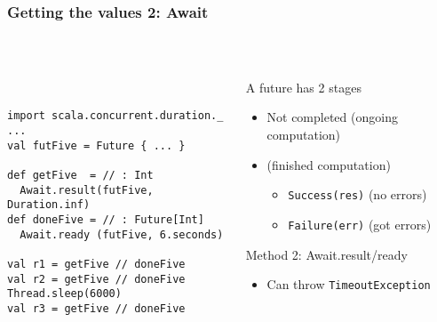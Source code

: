 \documentclass[aspectratio=169]{beamer}
\begin{document}
\begin{frame}[fragile]\frametitle{Getting the values 2: Await}
~\\[-8mm]
\begin{columns}
\begin{column}{0.56\textwidth}
~\\
\begin{lstlisting}[emph={execute,sleep,log,Future,Try,Success,Failure,onComplete,Await,result,ready}]
import scala.concurrent.duration._
...
val futFive = Future { ... }

def getFive  = // : Int
  Await.result(futFive, Duration.inf) 
def doneFive = // : Future[Int]
  Await.ready (futFive, 6.seconds)

val r1 = getFive // doneFive
val r2 = getFive // doneFive
Thread.sleep(6000)
val r3 = getFive // doneFive
\end{lstlisting}
\end{column}
\begin{column}{0.46\textwidth}
\begin{block}{A future has 2 stages}
\begin{itemize}
  \item \alert{Not completed} (ongoing computation)
  \item {} (finished computation)
  \begin{itemize}
    \item \texttt{Success(res)} (no errors)
    \item \texttt{Failure(err)} (got errors)
  \end{itemize}
\end{itemize}
\end{block}
\begin{alertblock}{Method 2: Await.result/ready}
  \begin{itemize}
    \item Can throw \texttt{TimeoutException}
  \end{itemize}
\end{alertblock}

\end{column}
\end{columns}
\end{frame}
\end{document}
